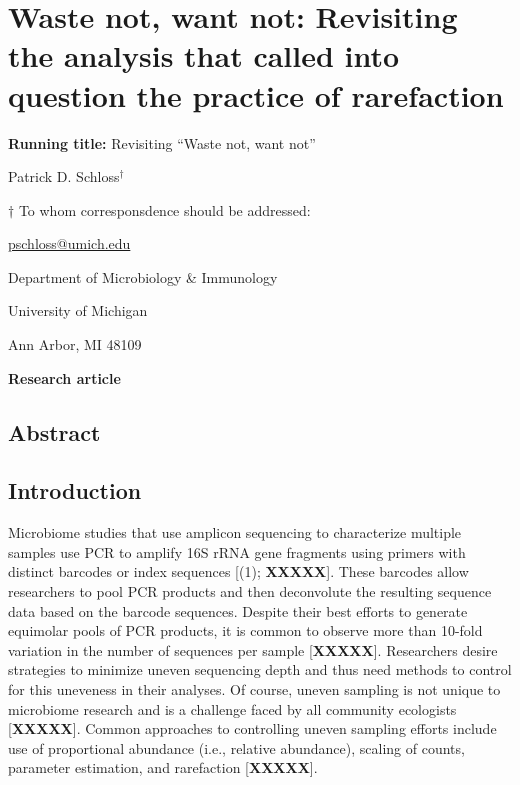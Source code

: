 \documentclass[
]{article}
\author{}
\date{\vspace{-2.5em}}
\begin{document}
\raggedright

\hypertarget{waste-not-want-not-revisiting-the-analysis-that-called-into-question-the-practice-of-rarefaction}{%
\section{Waste not, want not: Revisiting the analysis that called into
question the practice of
rarefaction}\label{waste-not-want-not-revisiting-the-analysis-that-called-into-question-the-practice-of-rarefaction}}

\vspace{20mm}

\textbf{Running title:} Revisiting ``Waste not, want not''

\vspace{20mm}

Patrick D. Schloss\({^\dagger}\)

\vspace{40mm}

\({\dagger}\) To whom corresponsdence should be addressed:

\href{mailto:pschloss@umich.edu}{pschloss@umich.edu}

Department of Microbiology \& Immunology

University of Michigan

Ann Arbor, MI 48109

\vspace{20mm}

\textbf{Research article}

\newpage

\hypertarget{abstract}{%
\subsection{Abstract}\label{abstract}}

\newpage

\hypertarget{introduction}{%
\subsection{Introduction}\label{introduction}}

Microbiome studies that use amplicon sequencing to characterize multiple
samples use PCR to amplify 16S rRNA gene fragments using primers with
distinct barcodes or index sequences {[}(1); \textbf{XXXXX}{]}. These
barcodes allow researchers to pool PCR products and then deconvolute the
resulting sequence data based on the barcode sequences. Despite their
best efforts to generate equimolar pools of PCR products, it is common
to observe more than 10-fold variation in the number of sequences per
sample {[}\textbf{XXXXX}{]}. Researchers desire strategies to minimize
uneven sequencing depth and thus need methods to control for this
uneveness in their analyses. Of course, uneven sampling is not unique to
microbiome research and is a challenge faced by all community ecologists
{[}\textbf{XXXXX}{]}. Common approaches to controlling uneven sampling
efforts include use of proportional abundance (i.e., relative
abundance), scaling of counts, parameter estimation, and rarefaction
{[}\textbf{XXXXX}{]}.
\end{document}
